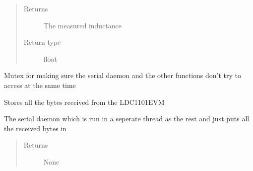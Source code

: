 \documentclass[letterpaper,10pt,english]{sphinxmanual}
\begin{document}
\begin{fulllineitems}
\begin{fulllineitems}
\begin{quote}
\begin{description}
\item[{Returns}] \leavevmode
\sphinxAtStartPar
The measured inductance

\item[{Return type}] \leavevmode
\sphinxAtStartPar
float

\end{description}\end{quote}

\end{fulllineitems}


\begin{fulllineitems}
\label{\detokenize{index:ldc1101evm.ldc1101evm.lock}}
\sphinxAtStartPar
Mutex for making sure the serial daemon and the other functions don’t try to access {\hyperref[\detokenize{index:ldc1101evm.ldc1101evm.received_bytes}]{}} at the same time

\end{fulllineitems}


\begin{fulllineitems}
\label{\detokenize{index:ldc1101evm.ldc1101evm.received_bytes}}
\sphinxAtStartPar
Stores all the bytes received from the LDC1101EVM

\end{fulllineitems}


\begin{fulllineitems}
\label{\detokenize{index:ldc1101evm.ldc1101evm.serial_daemon}}
\sphinxAtStartPar
The serial daemon which is run in a seperate thread as the rest and just puts all the received bytes in {\hyperref[\detokenize{index:ldc1101evm.ldc1101evm.received_bytes}]{}}
\begin{quote}\begin{description}
\item[{Returns}] \leavevmode
\sphinxAtStartPar
None


\end{description}
\end{quote}
\end{fulllineitems}
\end{fulllineitems}
\end{document}
